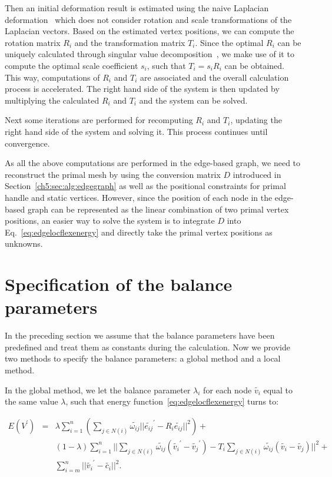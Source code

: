 Then an initial deformation result is  estimated using the naive
Laplacian deformation~\cite{AM01} which does not consider rotation
and scale transformations of the Laplacian vectors. Based on the
estimated vertex positions, we can compute the rotation matrix $R_i$
and the transformation matrix $T_i$. Since the optimal $R_i$ can be
uniquely calculated through singular value
decomposition~\cite{SA07}, we make use of it to compute the optimal
scale coefficient $s_i$, such that $T_i=s_iR_i$ can be obtained.
This way, computations of $R_i$ and $T_i$ are associated and the
overall calculation process is accelerated. The right hand side of
the system is then updated by multiplying the calculated $R_i$ and
$T_i$ and the system can be solved.

Next some iterations are performed for  recomputing $R_i$ and $T_i$,
updating the right hand side of the system and solving it. This
process continues until convergence.

As all the above computations are  performed in the edge-based
graph, we need to reconstruct the primal mesh by using the
conversion matrix $D$ introduced in
Section~\ref{ch5:sec:alg:edgegraph} as well as the positional
constraints for primal handle and static vertices. However, since
the position of each node in the edge-based graph can be represented
as the linear combination of two primal vertex positions, an easier
way to solve the system is to integrate $D$ into
Eq.~\ref{eq:edgelocflexenergy} and directly take the primal vertex
positions as unknowns.



\section{Specification of the balance parameters}

In the preceding section we assume that the  balance parameters have
been predefined and treat them as constants during the calculation.
Now we  provide two methods to specify the balance parameters: a
global method and a local method.

In the global method, we let the  balance parameter $\lambda_i$ for
each node $\tilde{v_i}$ equal to the same value $\lambda$, such that
energy function~\ref{eq:edgelocflexenergy} turns to:

\begin{eqnarray}
\label{eq:edgeglbflexenergy}
E(V^\prime) &=& \lambda\sum\limits_{i=1}^n{(\sum\limits_{j\in N(i)}{\tilde{\omega_{ij}} ||\tilde{e_{ij}}^\prime -R_i \tilde{e_{ij}}||^2})}+\nonumber\\
& & (1-\lambda)\sum\limits_{i=1}^n{||\sum\limits_{j\in N(i)}{\tilde{\omega_{ij}}(\tilde{v_i}^\prime - \tilde{v_j}^\prime)} -T_i\sum\limits_{j\in N(i)}{\tilde{\omega_{ij}}(\tilde{v_i} - \tilde{v_j})}||^2}+\nonumber\\
& &\sum\limits_{i=m}^n{||\tilde{v_i}^\prime-\tilde{c_i}||^2}.
\end{eqnarray}

